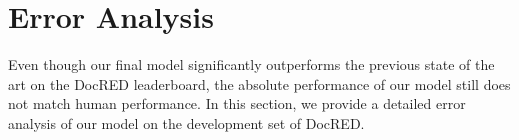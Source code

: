\documentclass[11pt]{article}
\begin{document}
\section{Error Analysis}
\label{sec:error-analysis}


Even though our final model significantly outperforms the previous state of the art on the DocRED leaderboard, the absolute performance of our model still does not match human performance. In this section, we provide a detailed error analysis of our model on the development set of DocRED.

\begin{table}[ht]
\newcommand{\multirot}[1]{\multirow{4}{*}[1.0ex]{\rotcell{\rlap{#1}}}}
\centering
\def\arraystretch{1.0}
\caption{Statistics of our error distribution. The final evaluation score is evaluated on  \textbf{R} triples, hence the correct predictions of \textbf{NR} are ignored when calculating the final scores.}
\label{tab:error-types}
\end{table}
\end{document}
